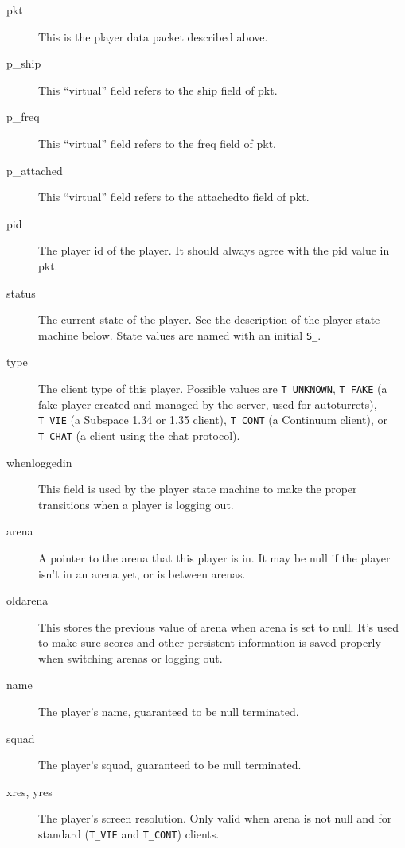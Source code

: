 \documentclass{article}
\begin{document}
\begin{description}

\item[pkt] This is the player data packet described above.

\item[p\_ship] This ``virtual'' field refers to the ship field of pkt.

\item[p\_freq] This ``virtual'' field refers to the freq field of pkt.

\item[p\_attached] This ``virtual'' field refers to the attachedto field
of pkt.

\item[pid] The player id of the player. It should always agree with the
pid value in pkt.

\item[status] The current state of the player. See the description of
the player state machine below. State values are named with an initial
\verb/S_/.

\item[type] The client type of this player. Possible values are
\verb/T_UNKNOWN/, \verb/T_FAKE/ (a fake player created and managed by
the server, used for autoturrets), \verb/T_VIE/ (a Subspace 1.34 or 1.35
client), \verb/T_CONT/ (a Continuum client), or \verb/T_CHAT/ (a client
using the chat protocol).

\item[whenloggedin] This field is used by the player state machine to
make the proper transitions when a player is logging out.

\item[arena] A pointer to the arena that this player is in. It may be
null if the player isn't in an arena yet, or is between arenas.

\item[oldarena] This stores the previous value of arena when arena is
set to null. It's used to make sure scores and other persistent
information is saved properly when switching arenas or logging out.

\item[name] The player's name, guaranteed to be null terminated.

\item[squad] The player's squad, guaranteed to be null terminated.

\item[xres, yres] The player's screen resolution. Only valid when arena
is not null and for standard (\verb/T_VIE/ and \verb/T_CONT/) clients.


\end{description}
\end{document}
